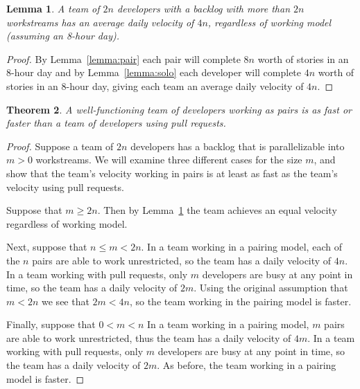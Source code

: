 \documentclass[letterpaper]{article}
\newtheorem{theorem}{Theorem}[section]
\newtheorem{lemma}[theorem]{Lemma}
\theoremstyle{definition}
\begin{document}
    \begin{lemma}\label{lemma:parallel}
        A team of $2n$ developers with a backlog with more than $2n$ workstreams has an average daily velocity of $4n$,
        regardless of working model (assuming an 8-hour day).
    \end{lemma}
    \begin{proof}
        By Lemma~\ref{lemma:pair} each pair will complete $8n$ worth of stories in an 8-hour day and by
        Lemma~\ref{lemma:solo} each developer will complete $4n$ worth of stories in an 8-hour day, giving each team an
        average daily velocity of $4n$.
    \end{proof}

    \begin{theorem}
        A well-functioning team of developers working as pairs is as fast or faster than a team of developers using pull
        requests.
    \end{theorem}
    \begin{proof}
        Suppose a team of $2n$ developers has a backlog that is parallelizable into $m > 0$ workstreams.
        We will examine three different cases for the size $m$, and show that the team's velocity working in pairs is at
        least as fast as the team's velocity using pull requests.

        Suppose that $m\geq 2n$.
        Then by Lemma~\ref{lemma:parallel} the team achieves an equal velocity regardless of working model.

        Next, suppose that $n\leq m < 2n$.
        In a team working in a pairing model, each of the $n$ pairs are able to work unrestricted, so the team has a
        daily velocity of $4n$.
        In a team working with pull requests, only $m$ developers are busy at any point in time, so the team has a daily
        velocity of $2m$.
        Using the original assumption that $m < 2n$ we see that $2m < 4n$, so the team working in the pairing model is
        faster.

        Finally, suppose that $0 < m < n$
        In a team working in a pairing model, $m$ pairs are able to work unrestricted, thus the team has a daily
        velocity of $4m$.
        In a team working with pull requests, only $m$ developers are busy at any point in time, so the team has a daily
        velocity of $2m$.
        As before, the team working in a pairing model is faster.
    \end{proof}
\end{document}
